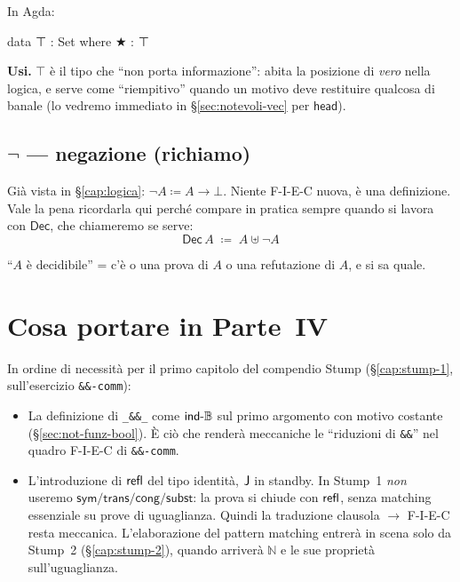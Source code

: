 \medskip

In Agda:

\begin{agda}
data ⊤ : Set where
  ★ : ⊤
\end{agda}

\noindent\textbf{Usi.} $\top$ \`e il tipo che ``non porta informazione'': abita la posizione di \emph{vero} nella logica, e serve come ``riempitivo'' quando un motivo deve restituire qualcosa di banale (lo vedremo immediato in \S\ref{sec:notevoli-vec} per $\mathsf{head}$).

\subsection*{$\neg$ --- negazione (richiamo)}

Gi\`a vista in \S\ref{cap:logica}: $\neg A \coloneqq A \to \bot$. Niente F-I-E-C nuova, \`e una definizione. Vale la pena ricordarla qui perch\'e compare in pratica sempre quando si lavora con $\mathsf{Dec}$, che chiameremo se serve:
\[
\mathsf{Dec}\,A \;\coloneqq\; A \uplus \neg A
\]

\noindent ``$A$ \`e decidibile'' = c'\`e o una prova di $A$ o una refutazione di $A$, e si sa quale.

\section{Cosa portare in Parte~IV}

In ordine di necessit\`a per il primo capitolo del compendio Stump (\S\ref{cap:stump-1}, sull'esercizio \texttt{\&\&-comm}):

\begin{itemize}
\item La definizione di \texttt{\_\&\&\_} come $\mathsf{ind\text{-}\mathbb{B}}$ sul primo argomento con motivo costante (\S\ref{sec:not-funz-bool}). \`E ci\`o che render\`a meccaniche le ``riduzioni di \texttt{\&\&}'' nel quadro F-I-E-C di \texttt{\&\&-comm}.
\item L'introduzione di $\mathsf{refl}$ del tipo identit\`a, $\mathsf{J}$ in standby. In Stump~1 \emph{non} useremo $\mathsf{sym}/\mathsf{trans}/\mathsf{cong}/\mathsf{subst}$: la prova si chiude con $\mathsf{refl}$, senza matching essenziale su prove di uguaglianza. Quindi la traduzione clausola $\to$ F-I-E-C resta meccanica. L'elaborazione del pattern matching entrer\`a in scena solo da Stump~2 (\S\ref{cap:stump-2}), quando arriver\`a $\mathbb{N}$ e le sue propriet\`a sull'uguaglianza.
\end{itemize}